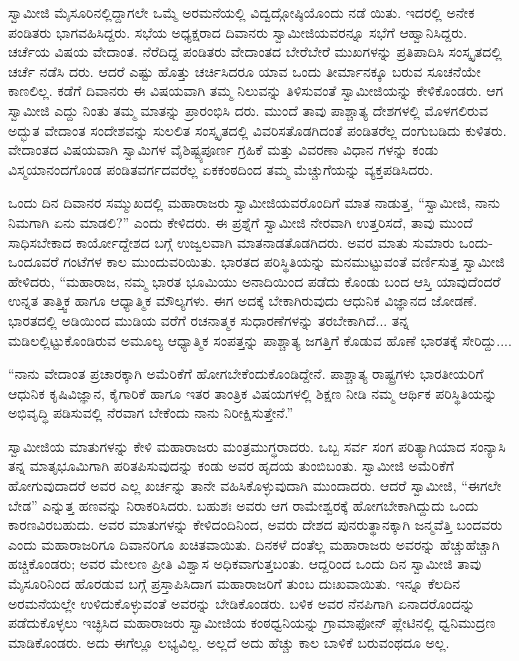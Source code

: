 ಸ್ವಾಮೀಜಿ ಮೈಸೂರಿನಲ್ಲಿದ್ದಾಗಲೇ ಒಮ್ಮೆ ಅರಮನೆಯಲ್ಲಿ ವಿದ್ವದ್ಗೋಷ್ಠಿಯೊಂದು ನಡೆ ಯಿತು. ಇದರಲ್ಲಿ ಅನೇಕ ಪಂಡಿತರು ಭಾಗವಹಿಸಿದ್ದರು. ಸಭೆಯ ಅಧ್ಯಕ್ಷರಾದ ದಿವಾನರು ಸ್ವಾಮೀಜಿಯವರನ್ನೂ ಸಭೆಗೆ ಆಹ್ವಾನಿಸಿದ್ದರು. ಚರ್ಚೆಯ ವಿಷಯ ವೇದಾಂತ. ನೆರೆದಿದ್ದ ಪಂಡಿತರು ವೇದಾಂತದ ಬೇರೆಬೇರೆ ಮುಖಗಳನ್ನು ಪ್ರತಿಪಾದಿಸಿ ಸಂಸ್ಕೃತದಲ್ಲಿ ಚರ್ಚೆ ನಡೆಸಿ ದರು. ಆದರೆ ಎಷ್ಟು ಹೊತ್ತು ಚರ್ಚಿಸಿದರೂ ಯಾವ ಒಂದು ತೀರ್ಮಾನಕ್ಕೂ ಬರುವ ಸೂಚನೆಯೇ ಕಾಣಲಿಲ್ಲ. ಕಡೆಗೆ ದಿವಾನರು ಈ ವಿಷಯವಾಗಿ ತಮ್ಮ ನಿಲುವನ್ನು ತಿಳಿಸುವಂತೆ ಸ್ವಾಮೀಜಿಯನ್ನು ಕೇಳಿಕೊಂಡರು. ಆಗ ಸ್ವಾಮೀಜಿ ಎದ್ದು ನಿಂತು ತಮ್ಮ ಮಾತನ್ನು ಪ್ರಾರಂಭಿಸಿ ದರು. ಮುಂದೆ ತಾವು ಪಾಶ್ಚಾತ್ಯ ದೇಶಗಳಲ್ಲಿ ಮೊಳಗಲಿರುವ ಅದ್ಭುತ ವೇದಾಂತ ಸಂದೇಶವನ್ನು ಸುಲಲಿತ ಸಂಸ್ಕೃತದಲ್ಲಿ ವಿವರಿಸತೊಡಗಿದಂತೆ ಪಂಡಿತರೆಲ್ಲ ದಂಗುಬಡಿದು ಕುಳಿತರು. ವೇದಾಂತದ ವಿಷಯವಾಗಿ ಸ್ವಾಮಿಗಳ ವೈಶಿಷ್ಟ್ಯಪೂರ್ಣ ಗ್ರಹಿಕೆ ಮತ್ತು ವಿವರಣಾ ವಿಧಾನ ಗಳನ್ನು ಕಂಡು ವಿಸ್ಮಯಾನಂದಗೊಂಡ ಪಂಡಿತವರ್ಗದವರೆಲ್ಲ ಏಕಕಂಠದಿಂದ ತಮ್ಮ ಮೆಚ್ಚುಗೆಯನ್ನು ವ್ಯಕ್ತಪಡಿಸಿದರು.

ಒಂದು ದಿನ ದಿವಾನರ ಸಮ್ಮುಖದಲ್ಲಿ ಮಹಾರಾಜರು ಸ್ವಾಮೀಜಿಯವರೊಂದಿಗೆ ಮಾತ ನಾಡುತ್ತ, “ಸ್ವಾಮೀಜಿ, ನಾನು ನಿಮಗಾಗಿ ಏನು ಮಾಡಲಿ?” ಎಂದು ಕೇಳಿದರು. ಈ ಪ್ರಶ್ನೆಗೆ ಸ್ವಾಮೀಜಿ ನೇರವಾಗಿ ಉತ್ತರಿಸದೆ, ತಾವು ಮುಂದೆ ಸಾಧಿಸಬೇಕಾದ ಕಾರ್ಯೋದ್ದೇಶದ ಬಗ್ಗೆ ಉಜ್ವಲವಾಗಿ ಮಾತನಾಡತೊಡಗಿದರು. ಅವರ ಮಾತು ಸುಮಾರು ಒಂದು-ಒಂದೂವರೆ ಗಂಟೆಗಳ ಕಾಲ ಮುಂದುವರಿಯಿತು. ಭಾರತದ ಪರಿಸ್ಥಿತಿಯನ್ನು ಮನಮುಟ್ಟುವಂತೆ ವರ್ಣಿಸುತ್ತ ಸ್ವಾಮೀಜಿ ಹೇಳಿದರು, “ಮಹಾರಾಜ, ನಮ್ಮ ಭಾರತ ಭೂಮಿಯು ಅನಾದಿಯಿಂದ ಪಡೆದು ಕೊಂಡು ಬಂದ ಆಸ್ತಿ ಯಾವುದೆಂದರೆ ಉನ್ನತ ತಾತ್ತ್ವಿಕ ಹಾಗೂ ಆಧ್ಯಾತ್ಮಿಕ ಮೌಲ್ಯಗಳು. ಈಗ ಅದಕ್ಕೆ ಬೇಕಾಗಿರುವುದು ಆಧುನಿಕ ವಿಜ್ಞಾನದ ಜೋಡಣೆ. ಭಾರತದಲ್ಲಿ ಅಡಿಯಿಂದ ಮುಡಿಯ ವರೆಗೆ ರಚನಾತ್ಮಕ ಸುಧಾರಣೆಗಳನ್ನು ತರಬೇಕಾಗಿದೆ... ತನ್ನ ಮಡಿಲಲ್ಲಿಟ್ಟುಕೊಂಡಿರುವ ಅಮೂಲ್ಯ ಆಧ್ಯಾತ್ಮಿಕ ಸಂಪತ್ತನ್ನು ಪಾಶ್ಚಾತ್ಯ ಜಗತ್ತಿಗೆ ಕೊಡುವ ಹೊಣೆ ಭಾರತಕ್ಕೆ ಸೇರಿದ್ದು....

“ನಾನು ವೇದಾಂತ ಪ್ರಚಾರಕ್ಕಾಗಿ ಅಮೆರಿಕೆಗೆ ಹೋಗಬೇಕೆಂದುಕೊಂಡಿದ್ದೇನೆ. ಪಾಶ್ಚಾತ್ಯ ರಾಷ್ಟ್ರಗಳು ಭಾರತೀಯರಿಗೆ ಆಧುನಿಕ ಕೃಷಿವಿಜ್ಞಾನ, ಕೈಗಾರಿಕೆ ಹಾಗೂ ಇತರ ತಾಂತ್ರಿಕ ವಿಷಯಗಳಲ್ಲಿ ಶಿಕ್ಷಣ ನೀಡಿ ನಮ್ಮ ಆರ್ಥಿಕ ಪರಿಸ್ಥಿತಿಯನ್ನು ಅಭಿವೃದ್ಧಿ ಪಡಿಸುವಲ್ಲಿ ನೆರವಾಗ ಬೇಕೆಂದು ನಾನು ನಿರೀಕ್ಷಿಸುತ್ತೇನೆ.”

ಸ್ವಾಮೀಜಿಯ ಮಾತುಗಳನ್ನು ಕೇಳಿ ಮಹಾರಾಜರು ಮಂತ್ರಮುಗ್ಧರಾದರು. ಒಬ್ಬ ಸರ್ವ ಸಂಗ ಪರಿತ್ಯಾಗಿಯಾದ ಸಂನ್ಯಾಸಿ ತನ್ನ ಮಾತೃಭೂಮಿಗಾಗಿ ಪರಿತಪಿಸುವುದನ್ನು ಕಂಡು ಅವರ ಹೃದಯ ತುಂಬಿಬಂತು. ಸ್ವಾಮೀಜಿ ಅಮೆರಿಕೆಗೆ ಹೋಗುವುದಾದರೆ ಅವರ ಎಲ್ಲ ಖರ್ಚನ್ನು ತಾನೇ ವಹಿಸಿಕೊಳ್ಳುವುದಾಗಿ ಮುಂದಾದರು. ಆದರೆ ಸ್ವಾಮೀಜಿ, “ಈಗಲೇ ಬೇಡ” ಎನ್ನುತ್ತ ಹಣವನ್ನು ನಿರಾಕರಿಸಿದರು. ಬಹುಶಃ ಅವರು ಆಗ ರಾಮೇಶ್ವರಕ್ಕೆ ಹೋಗಬೇಕಾಗಿದ್ದುದು ಒಂದು ಕಾರಣವಿರಬಹುದು. ಅವರ ಮಾತುಗಳನ್ನು ಕೇಳಿದಂದಿನಿಂದ, ಅವರು ದೇಶದ ಪುನರುತ್ಥಾನಕ್ಕಾಗಿ ಜನ್ಮವೆತ್ತಿ ಬಂದವರು ಎಂದು ಮಹಾರಾಜರಿಗೂ ದಿವಾನರಿಗೂ ಖಚಿತವಾಯಿತು. ದಿನಕಳೆ ದಂತೆಲ್ಲ ಮಹಾರಾಜರು ಅವರನ್ನು ಹೆಚ್ಚುಹೆಚ್ಚಾಗಿ ಹಚ್ಚಿಕೊಂಡರು; ಅವರ ಮೇಲಣ ಪ್ರೀತಿ ವಿಶ್ವಾಸ ಅಧಿಕವಾಗುತ್ತಬಂತು. ಆದ್ದರಿಂದ ಒಂದು ದಿನ ಸ್ವಾಮೀಜಿ ತಾವು ಮೈಸೂರಿನಿಂದ ಹೊರಡುವ ಬಗ್ಗೆ ಪ್ರಸ್ತಾಪಿಸಿದಾಗ ಮಹಾರಾಜರಿಗೆ ತುಂಬ ದುಃಖವಾಯಿತು. ಇನ್ನೂ ಕೆಲದಿನ ಅರಮನೆಯಲ್ಲೇ ಉಳಿದುಕೊಳ್ಳುವಂತೆ ಅವರನ್ನು ಬೇಡಿಕೊಂಡರು. ಬಳಿಕ ಅವರ ನೆನಪಿಗಾಗಿ ಏನಾದರೊಂದನ್ನು ಪಡೆದುಕೊಳ್ಳಲು ಇಚ್ಛಿಸಿದ ಮಹಾರಾಜರು ಸ್ವಾಮೀಜಿಯ ಕಂಠಧ್ವನಿಯನ್ನು ಗ್ರಾಮಾಫೋನ್ ಪ್ಲೇಟಿನಲ್ಲಿ ಧ್ವನಿಮುದ್ರಣ ಮಾಡಿಕೊಂಡರು. ಅದು ಈಗೆಲ್ಲೂ ಲಭ್ಯವಿಲ್ಲ. ಅಲ್ಲದೆ ಅದು ಹೆಚ್ಚು ಕಾಲ ಬಾಳಿಕೆ ಬರುವಂಥದೂ ಅಲ್ಲ.

